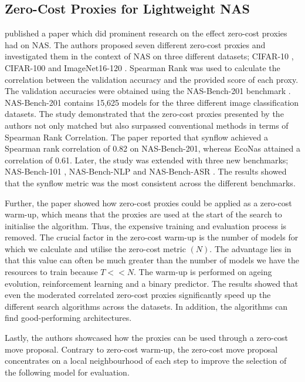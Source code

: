 \subsection{Zero-Cost Proxies for Lightweight NAS}\label{abdelfattah}
\cite{abdelfattah2021zero} published a paper which did prominent research on the effect zero-cost proxies had on \gls{NAS}. The authors proposed seven different zero-cost proxies and investigated them in the context of \gls{NAS} on three different datasets; CIFAR-10 \autocite{Krizhevsky2009LearningML}, CIFAR-100 \autocite{Krizhevsky2009LearningML} and ImageNet16-120 \autocite{deng2009imagenet}. Spearman Rank was used to calculate the correlation between the validation accuracy and the provided score of each proxy. The validation accuracies were obtained using the NAS-Bench-201 benchmark \autocite{dong2020bench}. NAS-Bench-201 contains 15,625 models for the three different image classification datasets. The study demonstrated that the zero-cost proxies presented by the authors not only matched but also surpassed conventional methods in terms of Spearman Rank Correlation. The paper reported that \gls{synflow} achieved a Spearman rank correlation of 0.82 on NAS-Bench-201, whereas \gls{EcoNas} attained a correlation of 0.61. Later, the study was extended with three new benchmarks; NAS-Bench-101 \autocite{ying2019bench}, NAS-Bench-NLP \autocite{https://doi.org/10.48550/arxiv.2006.07116} and NAS-Bench-ASR \autocite{mehrotra2021bench}. The results showed that the \gls{synflow} metric was the most consistent across the different benchmarks. 

Further, the paper showed how zero-cost proxies could be applied as a zero-cost warm-up, which means that the proxies are used at the start of the search to initialise the algorithm. Thus, the expensive training and evaluation process is removed. The crucial factor in the zero-cost warm-up is the number of models for which we calculate and utilise the zero-cost metric $(N)$. The advantage lies in that this value can often be much greater than the number of models we have the resources to train because $T << N$. The warm-up is performed on ageing evolution, reinforcement learning and a binary predictor. The results showed that even the moderated correlated zero-cost proxies significantly speed up the different search algorithms across the datasets. In addition, the algorithms can find good-performing architectures. 

Lastly, the authors showcased how the proxies can be used through a zero-cost move proposal. Contrary to zero-cost warm-up, the zero-cost move proposal concentrates on a local neighbourhood of each step to improve the selection of the following model for evaluation. 